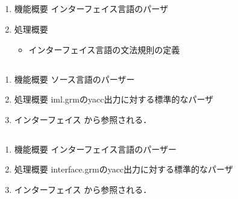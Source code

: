 \subsection{}
\begin{enumerate}
\item 機能概要 インターフェイス言語のパーザ
\item 処理概要 
\begin{itemize}
\item インターフェイス言語の文法規則の定義
\end{itemize}
\end{enumerate}

\subsection{}
\begin{enumerate}
\item 機能概要 ソース言語のパーザー
\item 処理概要 iml.grmのyacc出力に対する標準的なパーザ
\item インターフェイス
から参照される．
\end{enumerate}

\subsection{}
\begin{enumerate}
\item 機能概要 インターフェイス言語のパーザー
\item 処理概要 interface.grmのyacc出力に対する標準的なパーザ
\item インターフェイス
から参照される．
\end{enumerate}
\else%
\fi%

